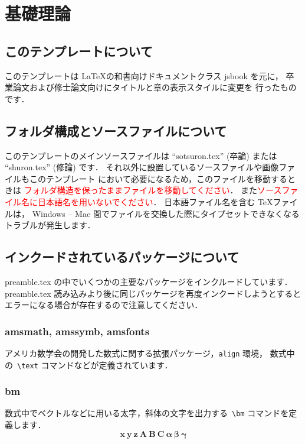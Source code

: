 \documentclass[dvipdfmx,disablejfam,nosetpagesize,12pt]{jsbook}
\begin{document}
\chapter{基礎理論} \label{Chap.basis}
\section{このテンプレートについて} \label{Sec.basis}
このテンプレートは \LaTeX の和書向けドキュメントクラス jsbook を元に，
卒業論文および修士論文向けにタイトルと章の表示スタイルに変更を
行ったものです．

\section{フォルダ構成とソースファイルについて}
このテンプレートのメインソースファイルは
``sotsuron.tex'' (卒論) または ``shuron.tex'' (修論) です．
それ以外に設置しているソースファイルや画像ファイルもこのテンプレート
において必要になるため，このファイルを移動するときは
\textcolor{red}{フォルダ構造を保ったままファイルを移動してください}．
また\textcolor{red}{ソースファイル名に日本語名を用いないでください}．
日本語ファイル名を含む \TeX ファイルは，
Windows -- Mac 間でファイルを交換した際にタイプセットできなくなる
トラブルが発生します．

\section{インクードされているパッケージについて}
preamble.tex の中でいくつかの主要なパッケージをインクルードしています．
preamble.tex 読み込みより後に同じパッケージを再度インクードしようとすると
エラーになる場合が存在するので注意してください．

\subsection*{amsmath, amssymb, amsfonts}
アメリカ数学会の開発した数式に関する拡張パッケージ，\verb+align+ 環境，
数式中の\ \verb+\text+ コマンドなどが定義されています．

\subsection*{bm}
数式中でベクトルなどに用いる太字，斜体の文字を出力する\ \verb+\bm+ 
コマンドを定義します．
\begin{equation}
   \bm{x}\ \bm{y\ z}\ \bm{A\ B\ C}\ \bm{\alpha\ \beta\ \gamma}
\end{equation}
\end{document}
